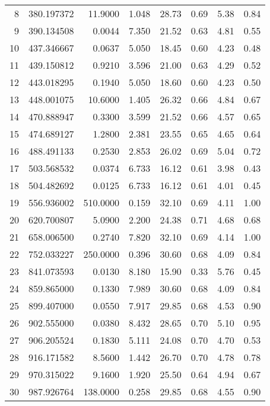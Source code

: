 \begin{longtable}{rrrrrrrr}
8    &   380.197372&   11.9000&  1.048&   28.73&   0.69&  5.38&  0.84\\
9    &   390.134508&    0.0044&  7.350&   21.52&   0.63&  4.81&  0.55\\
10    &   437.346667&    0.0637&  5.050&   18.45&   0.60&  4.23&  0.48\\
11    &   439.150812&    0.9210&  3.596&   21.00&   0.63&  4.29&  0.52\\
12    &   443.018295&    0.1940&  5.050&   18.60&   0.60&  4.23&  0.50\\
13    &   448.001075&   10.6000&  1.405&   26.32&   0.66&  4.84&  0.67\\
14    &   470.888947&    0.3300&  3.599&   21.52&   0.66&  4.57&  0.65\\
15    &   474.689127&    1.2800&  2.381&   23.55&   0.65&  4.65&  0.64\\
16    &   488.491133&    0.2530&  2.853&   26.02&   0.69&  5.04&  0.72\\
17    &   503.568532&    0.0374&  6.733&   16.12&   0.61&  3.98&  0.43\\
18    &   504.482692&    0.0125&  6.733&   16.12&   0.61&  4.01&  0.45\\
19    &   556.936002&  510.0000&  0.159&   32.10&   0.69&  4.11&  1.00\\
20    &   620.700807&    5.0900&  2.200&   24.38&   0.71&  4.68&  0.68\\
21    &   658.006500&    0.2740&  7.820&   32.10&   0.69&  4.14&  1.00\\
22    &   752.033227&  250.0000&  0.396&   30.60&   0.68&  4.09&  0.84\\
23    &   841.073593&    0.0130&  8.180&   15.90&   0.33&  5.76&  0.45\\
24    &   859.865000&    0.1330&  7.989&   30.60&   0.68&  4.09&  0.84\\
25    &   899.407000&    0.0550&  7.917&   29.85&   0.68&  4.53&  0.90\\
26    &   902.555000&    0.0380&  8.432&   28.65&   0.70&  5.10&  0.95\\
27    &   906.205524&    0.1830&  5.111&   24.08&   0.70&  4.70&  0.53\\
28    &   916.171582&    8.5600&  1.442&   26.70&   0.70&  4.78&  0.78\\
29    &   970.315022&    9.1600&  1.920&   25.50&   0.64&  4.94&  0.67\\
30    &   987.926764&  138.0000&  0.258&   29.85&   0.68&  4.55&  0.90\\
\hline
\end{longtable}



